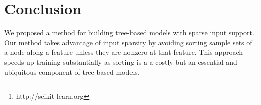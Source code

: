\documentclass{acm_proc_article-sp}
\begin{document}
\maketitle
\begin{abstract}
  Many machine learning tasks such as text annotation usually require
  training over very big datasets, e.g., millions of web documents,
  that can be represented in a sparse input space. State-of-the-art
  tree-based ensemble algorithms cannot scale to such datasets, since
  they include operations whose running time is a function of the
  input space size rather than a function of the non-zero input
  elements. 
  In this paper, we propose an efficient splitting algorithm to
  leverage input sparsity within decision tree
  methods. 
  Our algorithm improves training time over sparse datasets by more
  than two orders of magnitude and it has been incorporated in the current
  version of \emph{scikit-learn}\footnote{http://scikit-learn.org},
  the most popular open source Python machine learning library.
\end{abstract}












\section{Conclusion}
\label{sec:conclusion}
We proposed a method for building tree-based models with sparse input
support.  Our method takes advantage of input sparsity by avoiding
sorting sample sets of a node along a feature unless they are nonzero
at that feature. This approach speeds up training substantially as
sorting is a a costly but an essential and ubiquitous component of
tree-based models.
\end{document}
